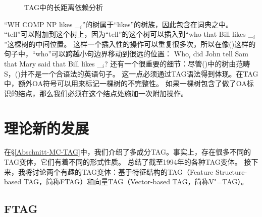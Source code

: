 \begin{figure}
\caption{\label{abb-nld-TAG}TAG中的长距离依赖分析}
\end{figure}%
``{WH COMP NP likes \_$_i$}''的树属于``{likes}''的树族，因此包含在词典之中。
``{tell}''可以附加到这个树上，因为``{tell}''的这个树可以插入到``{who that Bill likes \_$_i$}''这棵树的中间位置。
这样一个插入性的操作可以重复很多次，所以在像()这样的句子中，``{who}''可以跨越小句边界移动到很远的位置：
\ea 
Who$_i$ did John tell Sam that Mary said that Bill likes \_$_i$?
\z
%
还有一个很重要的细节：尽管()中的树由范畴S，()并不是一个合语法的英语句子。
\z
这一点必须通过TAG语法得到体现。在TAG中，额外OA符号可以用来标记一棵树的不完整性。
如果一棵树包含了做了OA标识的结点，那么我们必须在这个结点处施加一次附加操作。

\section{理论新的发展}

在\S \ref{Abschnitt-MC-TAG}中，我们介绍了多成分TAG。事实上，存在很多不同的TAG变体，它们有着不同的形式性质。
\citet[\page]{Rambow94a}总结了截至1994年的各种TAG变体。
接下来，我将讨论两个有趣的TAG变体：基于特征结构的TAG（Feature Structure-based TAG，简称FTAG\indexftag \citealp{VSJ88a}）和向量TAG（Vector-based TAG，简称V"=TAG\citealp{Rambow94a}）。

\subsection{FTAG}

